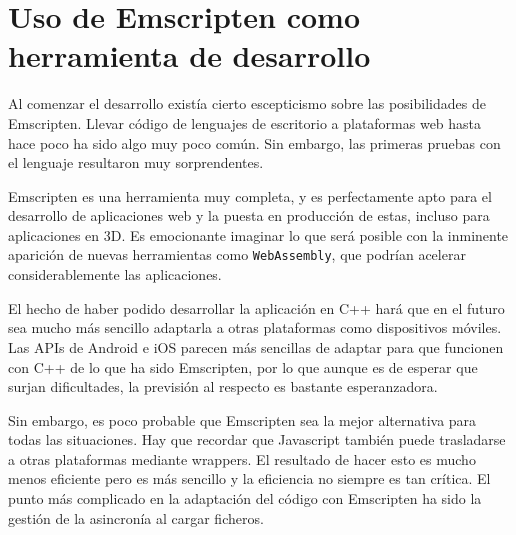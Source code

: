 \section{Uso de Emscripten como herramienta de desarrollo}
Al comenzar el desarrollo existía cierto escepticismo sobre las posibilidades de Emscripten. Llevar código de lenguajes de escritorio a plataformas web hasta hace poco ha sido algo muy poco común. Sin embargo, las primeras pruebas con el lenguaje resultaron muy sorprendentes.

Emscripten es una herramienta muy completa, y es perfectamente apto para el desarrollo de aplicaciones web y la puesta en producción de estas, incluso para aplicaciones en 3D. Es emocionante imaginar lo que será posible con la inminente aparición de nuevas herramientas como \texttt{WebAssembly}, que podrían acelerar considerablemente las aplicaciones.

El hecho de haber podido desarrollar la aplicación en C++ hará que en el futuro sea mucho más sencillo adaptarla a otras plataformas como dispositivos móviles. Las APIs de Android e iOS parecen más sencillas de adaptar para que funcionen con C++ de lo que ha sido Emscripten, por lo que aunque es de esperar que surjan dificultades, la previsión al respecto es bastante esperanzadora.

Sin embargo, es poco probable que Emscripten sea la mejor alternativa para todas las situaciones. Hay que recordar que Javascript también puede trasladarse a otras plataformas mediante wrappers. El resultado de hacer esto es mucho menos eficiente pero es más sencillo y la eficiencia no siempre es tan crítica. El punto más complicado en la adaptación del código con Emscripten ha sido la gestión de la asincronía al cargar ficheros.